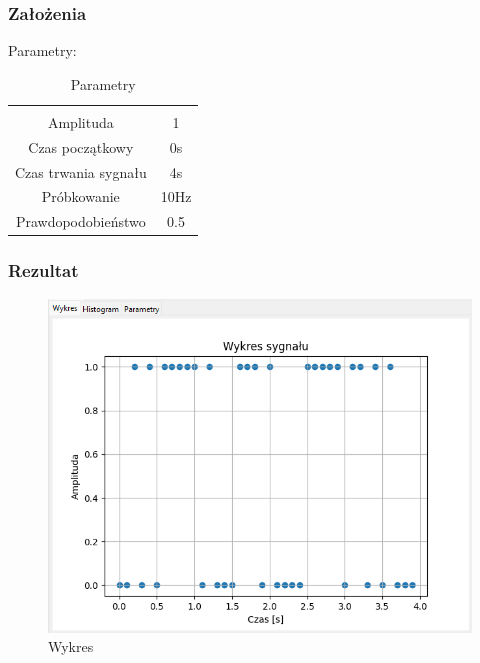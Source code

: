 \documentclass{article}
\begin{document}
\subsubsection{Założenia}
\noindent
Parametry:
\begin{table}[h!]
    \centering
    \vspace{0.2cm}
    \begin{tabular}{|c|c|}
        \hline\hline\\[-0.4cm]
        Amplituda & 1  \\
        \hline
        Czas początkowy & 0s  \\
        \hline
        Czas trwania sygnału & 4s  \\
        \hline
        Próbkowanie & 10Hz \\
        \hline
        Prawdopodobieństwo & 0.5\\
        \hline
    \end{tabular}
    \caption{Parametry}
    \label{szumimpuls}
\end{table}
\FloatBarrier
\subsubsection{Rezultat}
\begin{figure}[h!]
    \centering
    \includegraphics[width=\textwidth]{img/szum-impuls/wykres.png}
    \caption{Wykres}
\end{figure}
\end{document}
